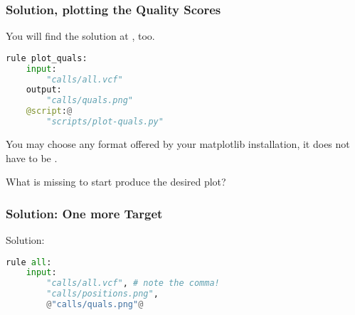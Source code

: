 \begin{frame}[fragile]
  \frametitle{Solution, plotting the Quality Scores}
  You will find the solution at , too.
  \begin{lstlisting}[language=Python,style=Python]
rule plot_quals:
    input:
        "calls/all.vcf"
    output:
        "calls/quals.png"
    @script:@
        "scripts/plot-quals.py"
  \end{lstlisting}
  \begin{hint}
  	You may choose any format offered by your matplotlib installation, it does not have to be .
  \end{hint}
  \pause
  \begin{question}
  	What is missing to start produce the desired plot?
  \end{question}
\end{frame}

\begin{frame}[fragile]
	\frametitle{Solution: One more Target}
	
	Solution:
	\begin{lstlisting}[language=Python,style=Python]
rule all:
    input:
        "calls/all.vcf", # note the comma!
        "calls/positions.png",
        @"calls/quals.png"@
	\end{lstlisting}
\end{frame}

